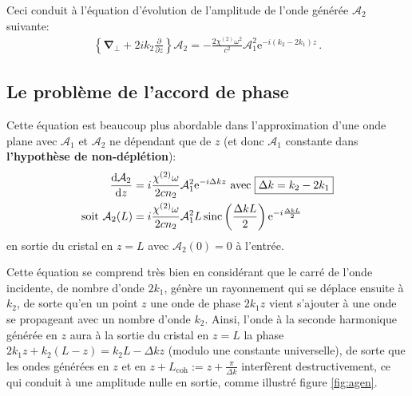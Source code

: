 \documentclass[11pt,a4paper]{article}
\newcommand{\A}{\mathcal{A}}
\newcommand{\e}[1]{\text{e}^{#1}}
\newcommand{\mathsc}[1]{\mathrm{\scriptscriptstyle {#1}}}
\renewcommand{\v}[1]{\boldsymbol{\mathbf{#1}}}
\begin{document}
Ceci conduit à l'équation d'évolution de l'amplitude de l'onde générée $\A_2$ suivante:
\begin{align}
	\left\{\v\nabla_\bot + 2 i k_2 \frac{\partial}{\partial z} \right\} \A_2 = - \frac{2 \chi^{(2)} \omega^2}{c^2} \A_1^2 \e{- i (k_2 - 2k_1) z} \,.
	\label{eq:SHG}
\end{align}

\subsection{Le problème de l'accord de phase}
\label{qpm}
Cette équation est beaucoup plus abordable dans l'approximation d'une onde plane avec $\A_1$ et $\A_2$ ne dépendant que de $z$ (et donc $\A_1$ constante dans \textbf{l'hypothèse de non-déplétion}):
\begin{align}
	\dv{\A_2}{z} &= i\frac{\chi^{(2)}\omega}{2cn_2} \A_1^2 \e{-i \Delta k z} \text{ avec } \boxed{\Delta k = k_2 - 2k_1} \label{eq:pwe} \\
	\text{soit } \A_2(L) &= i \frac{\chi^{(2)}\omega}{2 cn_2} \A_1^2 L \operatorname{sinc}\left( \frac{\Delta k L}{2} \right) \e{-i\frac{\Delta k L}{2}}
\end{align}
en sortie du cristal en $z=L$ avec $\A_2(0)=0$ à l'entrée.

Cette équation se comprend très bien en considérant que le carré de l'onde incidente, de nombre d'onde $2k_1$, génère un rayonnement qui se déplace ensuite à $k_2$, de sorte qu'en un point $z$ une onde de phase $2k_1z$ vient s'ajouter à une onde se propageant avec un nombre d'onde $k_2$. Ainsi, l'onde à la seconde harmonique générée en $z$ aura à la sortie du cristal en $z=L$ la phase $2k_1 z + k_2 (L-z) = k_2 L - \Delta k z$ (modulo une constante universelle), de sorte que les ondes générées en $z$ et en $z+L_\mathsc{coh} := z + \frac{\pi}{\Delta k}$ interfèrent destructivement, ce qui conduit à une amplitude nulle en sortie, comme illustré figure \ref{fig:agen}.
\end{document}
